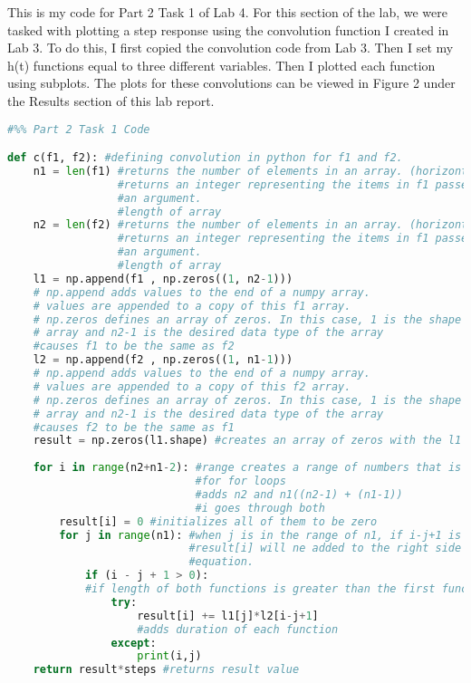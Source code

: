 \documentclass[12pt]{report}
\begin{document}
{This is my code for Part 2 Task 1 of Lab 4. For this section of the lab, we were tasked with plotting a step response using the convolution function I created in Lab 3. To do this, I first copied the convolution code from Lab 3. Then I set my h(t) functions equal to three different variables. Then I plotted each function using subplots. The plots for these convolutions can be viewed in Figure 2 under the Results section of this lab report. }
\begin{lstlisting}[language=Python]
#%% Part 2 Task 1 Code

def c(f1, f2): #defining convolution in python for f1 and f2.
    n1 = len(f1) #returns the number of elements in an array. (horizontal)
                 #returns an integer representing the items in f1 passed as
                 #an argument.
                 #length of array
    n2 = len(f2) #returns the number of elements in an array. (horizontal)
                 #returns an integer representing the items in f1 passed as
                 #an argument.
                 #length of array
    l1 = np.append(f1 , np.zeros((1, n2-1)))
    # np.append adds values to the end of a numpy array.
    # values are appended to a copy of this f1 array.
    # np.zeros defines an array of zeros. In this case, 1 is the shape of the
    # array and n2-1 is the desired data type of the array
    #causes f1 to be the same as f2
    l2 = np.append(f2 , np.zeros((1, n1-1)))
    # np.append adds values to the end of a numpy array.
    # values are appended to a copy of this f2 array.
    # np.zeros defines an array of zeros. In this case, 1 is the shape of the
    # array and n2-1 is the desired data type of the array
    #causes f2 to be the same as f1
    result = np.zeros(l1.shape) #creates an array of zeros with the l1 shape
    
    for i in range(n2+n1-2): #range creates a range of numbers that is nice
                             #for for loops
                             #adds n2 and n1((n2-1) + (n1-1))
                             #i goes through both
        result[i] = 0 #initializes all of them to be zero
        for j in range(n1): #when j is in the range of n1, if i-j+1 is > 0
                            #result[i] will ne added to the right side of the 
                            #equation.
            if (i - j + 1 > 0): 
            #if length of both functions is greater than the first function
                try:
                    result[i] += l1[j]*l2[i-j+1] 
                    #adds duration of each function
                except:
                    print(i,j)
    return result*steps #returns result value


\end{lstlisting}
\end{document}
